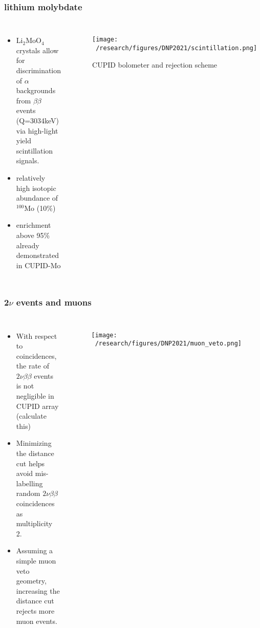 \documentclass{beamer}
\begin{document}

	\begin{frame}
		\frametitle{lithium molybdate}
		\begin{columns}[c] %
			
			\begin{itemize}
				\item Li$_2$MoO$_4$ crystals allow for discrimination of $\alpha$ backgrounds from $\beta\beta$ events (Q=3034keV) via high-light yield scintillation signals.
				\item relatively high isotopic abundance of $^{100}$Mo (10\%)
				\item enrichment above 95\% already demonstrated in CUPID-Mo \cite{}
			\end{itemize}
			
			\begin{figure}
			\texttt{[image: ~/research/figures/DNP2021/scintillation.png]}
			\caption{CUPID bolometer and rejection scheme}
			\end{figure}
		\end{columns}
	\end{frame}

	

	\begin{frame}
		\frametitle{2$\nu$ events and muons}
		\begin{columns}[c] %
			
			\begin{itemize}
				\item With respect to coincidences, the rate of $2\nu\beta\beta$ events is not negligible in CUPID array (calculate this)
				\item Minimizing the distance cut helps avoid mis-labelling random $2\nu\beta\beta$ coincidences as multiplicity 2.
				\item Assuming a simple muon veto geometry, increasing the distance cut rejects more muon events.
			\end{itemize}
			
			\begin{figure}
			\texttt{[image: ~/research/figures/DNP2021/muon\_veto.png]}
			\end{figure}
			
		\end{columns}
	\end{frame}
\end{document}
